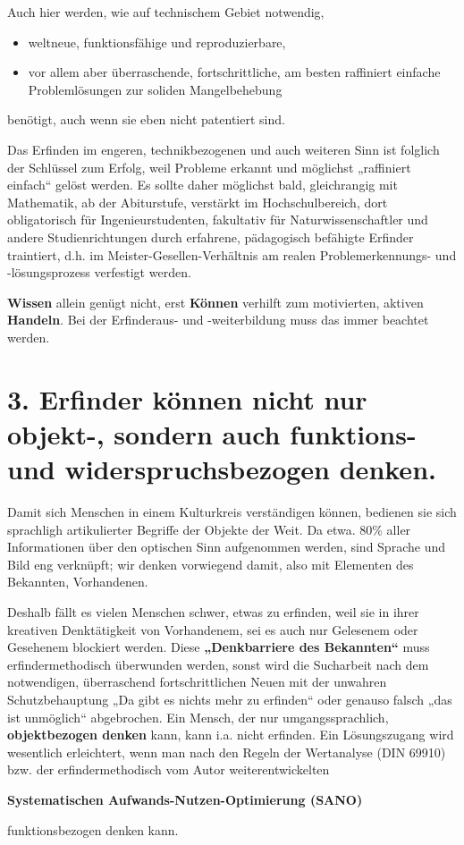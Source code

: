 \documentclass[11pt,a4paper]{article}
\begin{document}
Auch hier werden, wie auf technischem Gebiet notwendig,
\begin{itemize}[noitemsep]
\item weltneue, funktionsfähige und reproduzierbare,
\item vor allem aber überraschende, fortschrittliche, am besten raffiniert
  einfache Problem\-lö\-sun\-gen zur soliden Mangelbehebung
\end{itemize}
benötigt, auch wenn sie eben nicht patentiert sind.

Das Erfinden im engeren, technikbezogenen und auch weiteren Sinn ist folglich
der Schlüssel zum Erfolg, weil Probleme erkannt und möglichst „raffiniert
einfach“ gelöst werden. Es sollte daher möglichst bald, gleichrangig mit
Mathematik, ab der Abiturstufe, verstärkt im Hochschulbereich, dort
obligatorisch für Ingenieurstudenten, fakultativ für Naturwissenschaftler und
andere Studienrichtungen durch erfahrene, pädagogisch befähigte Erfinder
traintiert, d.h. im Meister-Gesellen-Verhältnis am realen Problemerkennungs-
und -lösungsprozess verfestigt werden.

\textbf{Wissen} allein genügt nicht, erst \textbf{Können} verhilft zum
motivierten, aktiven \textbf{Handeln}. Bei der Erfinderaus- und -weiterbildung
muss das immer beachtet werden.

\section*{3. Erfinder können nicht nur objekt-, sondern auch funktions- und 
widerspruchsbezogen denken.}

Damit sich Menschen in einem Kulturkreis verständigen können, bedienen sie
sich sprachligh artikulierter Begriffe der Objekte der Weit.  Da etwa. 80\%
aller Informationen über den optischen Sinn aufgenommen werden, sind Sprache
und Bild eng verknüpft; wir denken vorwiegend damit, also mit Elementen des
Bekannten, Vorhandenen.

Deshalb fällt es vielen Menschen schwer, etwas zu erfinden, weil sie in ihrer
kreativen Denk\-tä\-tig\-keit von Vorhandenem, sei es auch nur Gelesenem oder
Gesehenem blockiert werden.  Diese \textbf{„Denkbarriere des Bekannten“} muss
erfindermethodisch überwunden werden, sonst wird die Sucharbeit nach dem
notwendigen, überraschend fortschrittlichen Neuen mit der unwahren
Schutzbehauptung „Da gibt es nichts mehr zu erfinden“ oder genauso falsch „das
ist unmöglich“ abgebrochen.  Ein Mensch, der nur umgangssprachlich,
\textbf{objektbezogen denken} kann, kann i.a. nicht erfinden.  Ein
Lösungszugang wird wesentlich erleichtert, wenn man nach den Regeln der
Wertanalyse (DIN 69910) bzw. der erfindermethodisch vom Autor
weiterentwickelten
\begin{center}\bf  
  Systematischen Aufwands-Nutzen-Optimierung (SANO) 
\end{center}
funktionsbezogen denken kann.
\end{document}
